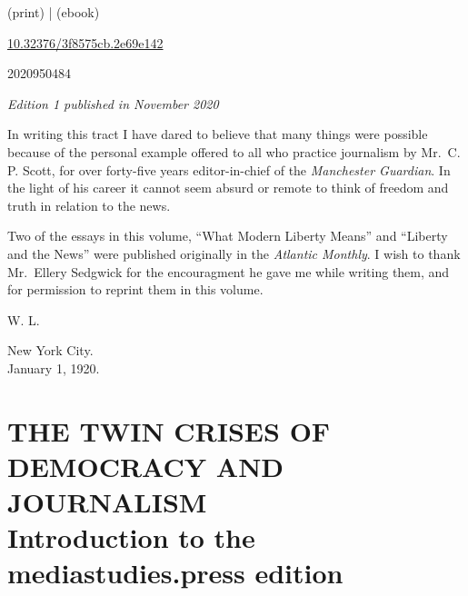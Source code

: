 \documentclass[openany,nobib,nohyper]{tufte-book}
\let\oldchapter\chapter
\def\chapter{%
  \setcounter{footnote}{0}%
  \oldchapter
}
\begin{document}
\begin{fullwidth}
\par {} (print) |  (ebook)

\par {} \href{https://doi.org/10.32376/3f8575cb.2e69e142}{10.32376/3f8575cb.2e69e142}

\par {} 2020950484

\par\textit{Edition 1 published in November 2020}






\newpage
\thispagestyle{empty}
\begingroup
\vspace*{.15in}

\setlength{\parindent}{5ex}
\huge{In writing this tract I have dared to believe that many things were
possible because of the personal example offered to all who practice
journalism by Mr.~C. P. Scott, for over forty-five years editor-in-chief
of the \emph{Manchester Guardian}. In the light of his career it cannot
seem absurd or remote to think of freedom and truth in relation to the
news.}

\huge{Two of the essays in this volume, ``What Modern Liberty Means'' and
``Liberty and the News'' were published originally in the \emph{Atlantic
Monthly}. I wish to thank Mr.~Ellery Sedgwick for the encouragment he
gave me while writing them, and for permission to reprint them in this
volume.}

\begin{flushright}W. L.\end{flushright}

\vspace*{2mm}

\noindent New York City.\\
January 1, 1920.

\endgroup
\begingroup


\LARGE

\tableofcontents

\endgroup

\end{fullwidth}

\chapter[THE TWIN CRISES OF DEMOCRACY AND JOURNALISM]{THE TWIN CRISES OF DEMOCRACY AND\\ JOURNALISM\\ Introduction to the mediastudies.press edition}
\label{ch:introduction-msp}
\end{document}
